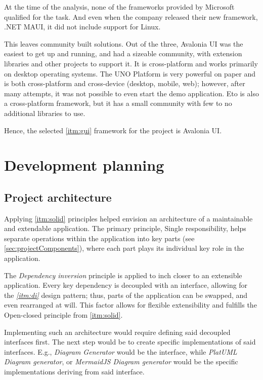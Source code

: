 At the time of the analysis, none of the frameworks provided by Microsoft qualified for the task. And even when the company released their new framework, .NET MAUI, it did not include support for Linux.

This leaves community built solutions.
Out of the three, Avalonia UI was the easiest to get up and running, and had a sizeable community, with extension libraries and other projects to support it. It is cross-platform and works primarily on desktop operating systems. The UNO Platform is very powerful on paper and is both cross-platform and cross-device (desktop, mobile, web); however, after many attempts, it was not possible to even start the demo application. Eto is also a cross-platform framework, but it has a small community with few to no additional libraries to use.

Hence, the selected \ref{itm:gui} framework for the project is Avalonia UI.

\section{Development planning}

\subsection{Project architecture} \label{sec:projectArchitecture}

Applying \ref{itm:solid} principles helped envision an architecture of a maintainable and extendable application.
The primary principle, Single responsibility, helps separate operations within the application into key parts (see \ref{sec:projectComponents}), where each part plays its individual key role in the application.

The \textit{Dependency inversion} principle is applied to inch closer to an extensible application. Every key dependency is decoupled with an interface, allowing for the \textit{\ref{itm:di}} design pattern; thus, parts of the application can be swapped, and even rearranged at will. This factor allows for flexible extensibility and fulfills the Open-closed principle from \ref{itm:solid}.

Implementing such an architecture would require defining said decoupled interfaces first.
The next step would be to create specific implementations of said interfaces. E.g., \textit{Diagram Generator} would be the interface, while \textit{PlatUML Diagram generator}, or \textit{MermaidJS Diagram generator} would be the specific implementations deriving from said interface.


